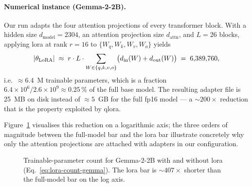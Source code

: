 \documentclass[12pt, a4paper]{report}
\DeclarePairedDelimiter{\abs}{\lvert}{\rvert}
\begin{document}
\paragraph{Numerical instance (Gemma-2-2B).} Our run adapts the four
attention projections of every transformer block. With a hidden size
\(d_{\mathrm{model}}=2304\), an attention projection size
\(d_{\mathrm{attn}}\), and \(L=26\) blocks, applying \gls{lora} at rank
\(r=16\) to \(\{W_{q}, W_{k}, W_{v}, W_{o}\}\) yields
\begin{equation}
  \abs{\theta_{\mathrm{LoRA}}}
    \;\approx\; r \cdot L \cdot \sum_{W \in \{q,k,v,o\}}
      \bigl(d_{\mathrm{in}}(W) + d_{\mathrm{out}}(W)\bigr)
    \;=\; 6{,}389{,}760,
  \label{eq:lora-count-gemma}
\end{equation}
i.e.\ \(\approx 6.4\)~M trainable parameters, which is a fraction
\(6.4 \times 10^{6} / 2.6 \times 10^{9} \approx 0.25\,\%\) of the full
base model. The resulting adapter file is 25~MB on disk instead of
\(\approx 5\)~GB for the full fp16 model --- a \(\sim\!200\!\times\)
reduction that is the property exploited by \gls{qlora}.

Figure~\ref{fig:lora-count} visualises this reduction on a logarithmic
axis; the three orders of magnitude between the full-model bar and the
\gls{lora} bar illustrate concretely why only the attention projections
are attached with adapters in our configuration.

\begin{figure}[H]
  \centering
  \caption[LoRA trainable fraction]{Trainable-parameter count for
           Gemma-2-2B with and without \gls{lora}
           (Eq.~\eqref{eq:lora-count-gemma}). The \gls{lora} bar is
           \(\sim\!407\times\) shorter than the full-model bar on the
           log axis.}
  \label{fig:lora-count}
\end{figure}
\end{document}
